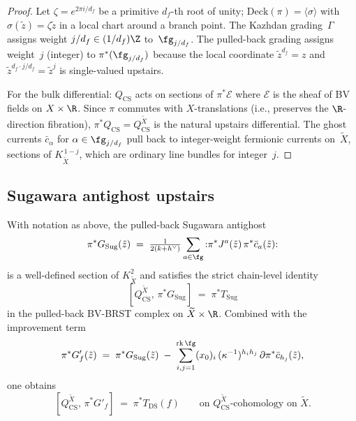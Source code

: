 \begin{proof}
Let $\zeta = e^{2\pi i / d_{f}}$ be a primitive $d_{f}$-th root
of unity; $\mathrm{Deck}(\pi) = \langle \sigma \rangle$ with
$\sigma(\tilde z) = \zeta \tilde z$ in a local chart around a
branch point. The Kazhdan grading~$\Gamma$ assigns weight
$j/d_{f} \in (1/d_{f})\Z$ to~$\fg_{j/d_{f}}$. The pulled-back
grading assigns weight~$j$ (integer) to
$\pi^{*}(\fg_{j/d_{f}})$ because the local coordinate
$\tilde z^{d_{f}} = z$ and
$\tilde z^{d_{f} \cdot j/d_{f}} = \tilde z^{j}$ is single-valued
upstairs.

For the bulk differential: $Q_{\mathrm{CS}}$ acts on sections of
$\pi^{*}\mathcal{E}$ where $\mathcal{E}$ is the sheaf of BV fields
on $X \times \R$. Since $\pi$ commutes with $X$-translations
(i.e., preserves the $\R$-direction fibration), $\pi^{*}Q_{\mathrm{CS}}
= Q_{\mathrm{CS}}^{\widetilde X}$ is the natural upstairs
differential. The ghost currents
$\bar c_{\alpha}$ for $\alpha \in \fg_{j/d_{f}}$ pull back to
integer-weight fermionic currents on~$\widetilde X$, sections of
$K_{\widetilde X}^{\,1-j}$, which are ordinary line bundles for
integer~$j$.
\end{proof}

\subsection{Sugawara antighost upstairs}
\label{subsec:sugawara-upstairs}

\begin{theorem}
\label{thm:sugawara-antighost-branched-cover}
With notation as above, the pulled-back Sugawara antighost
\[
\pi^{*}G_{\mathrm{Sug}}(\tilde z)
\;=\; \tfrac{1}{2(k+h^{\vee})}
 \sum_{a \in \fg} {:}\pi^{*}J^{a}(\tilde z)\,
 \pi^{*}\bar c_{a}(\tilde z){:}
\]
is a well-defined section of $K_{\widetilde X}^{2}$ and satisfies
the strict chain-level identity
\[
[Q_{\mathrm{CS}}^{\widetilde X},\, \pi^{*}G_{\mathrm{Sug}}]
\;=\; \pi^{*}T_{\mathrm{Sug}}
\]
in the pulled-back BV-BRST complex on $\widetilde X \times \R$.
Combined with the improvement term
\[
\pi^{*}G'_{f}(\tilde z)
\;=\; \pi^{*}G_{\mathrm{Sug}}(\tilde z)
 \;-\; \sum_{i,j=1}^{\operatorname{rk}\fg}
 (x_{0})_{i}\,(\kappa^{-1})^{h_{i} h_{j}}\,
 \partial\pi^{*}\bar c_{h_{j}}(\tilde z),
\]
one obtains
\[
[Q_{\mathrm{CS}}^{\widetilde X},\, \pi^{*}G'_{f}]
\;=\; \pi^{*}T_{\mathrm{DS}}(f) \qquad
\text{on $Q_{\mathrm{CS}}^{\widetilde X}$-cohomology on~$\widetilde X$.}
\]
\end{theorem}

